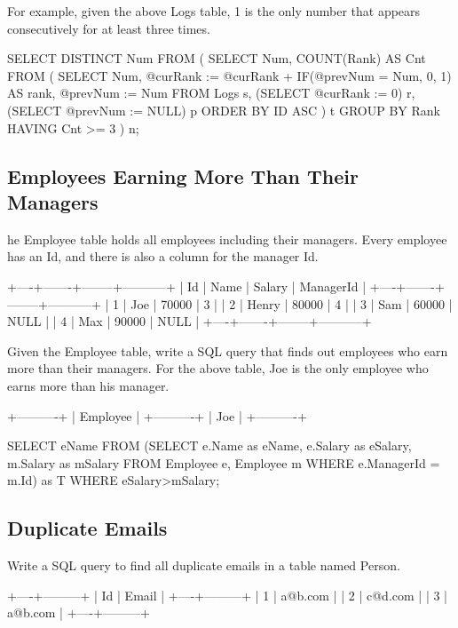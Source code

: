 For example, given the above Logs table, 1 is the only number that appears consecutively for at least three times.

\begin{Code}
	SELECT DISTINCT Num FROM (
		SELECT Num, COUNT(Rank) AS Cnt FROM (
			SELECT    Num,
			@curRank := @curRank + IF(@prevNum = Num, 0, 1) AS rank, @prevNum := Num
			FROM      Logs s, (SELECT @curRank := 0) r, (SELECT @prevNum := NULL) p
			ORDER BY  ID ASC
		) t GROUP BY Rank HAVING Cnt >= 3 
	) n;
\end{Code}

\subsection{Employees Earning More Than Their Managers}
he Employee table holds all employees including their managers. Every employee has an Id, and there is also a column for the manager Id.
\begin{Code}
	+----+-------+--------+-----------+
	| Id | Name  | Salary | ManagerId |
	+----+-------+--------+-----------+
	| 1  | Joe   | 70000  | 3         |
	| 2  | Henry | 80000  | 4         |
	| 3  | Sam   | 60000  | NULL      |
	| 4  | Max   | 90000  | NULL      |
	+----+-------+--------+-----------+
\end{Code}

Given the Employee table, write a SQL query that finds out employees who earn more than their managers. For the above table, Joe is the only employee who earns more than his 
manager.
\begin{Code}
	+----------+
	| Employee |
	+----------+
	| Joe      |
	+----------+
\end{Code}

\begin{Code}
	SELECT eName FROM (SELECT e.Name as eName, e.Salary as eSalary, m.Salary as mSalary 
				FROM Employee e, Employee m  WHERE e.ManagerId = m.Id) as T WHERE eSalary>mSalary;
\end{Code}

\subsection{Duplicate Emails}
Write a SQL query to find all duplicate emails in a table named Person.
\begin{Code}
	+----+---------+
	| Id | Email   |
	+----+---------+
	| 1  | a@b.com |
	| 2  | c@d.com |
	| 3  | a@b.com |
	+----+---------+
\end{Code}

